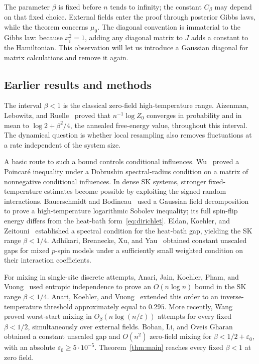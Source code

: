 The parameter $\beta$ is fixed before $n$ tends to infinity; the constant
$C_\beta$ may depend on that fixed choice. External fields enter the proof
through posterior Gibbs laws, while the theorem concerns $\mu_0$.
The diagonal convention is immaterial to the Gibbs law: because $x_i^2=1$,
adding any diagonal matrix to $J$ adds a constant to the Hamiltonian.
This observation will let us introduce a Gaussian diagonal for matrix
calculations and remove it again.

\subsection{Earlier results and methods}
The interval $\beta<1$ is the classical zero-field high-temperature
range. Aizenman, Lebowitz, and Ruelle~\cite[Proposition~2.1]{ALR1987}
proved that $n^{-1}\log Z_0$ converges in probability and in mean to
$\log2+\beta^2/4$, the annealed free-energy value, throughout this interval.
The dynamical question is whether local resampling also removes fluctuations at a rate independent
of the system size.

A basic route to such a bound controls conditional influences.
Wu~\cite{Wu2006} proved a Poincar\'e inequality under a
Dobrushin spectral-radius condition on a matrix of nonnegative
conditional influences.
In dense SK systems, stronger fixed-temperature estimates become possible
by exploiting the signed random interactions. Bauerschmidt and
Bodineau~\cite{BB2019} used a Gaussian field decomposition to prove a
high-temperature logarithmic Sobolev inequality; its full spin-flip energy
differs from the heat-bath form~\eqref{eq:dirichlet}.
Eldan, Koehler, and Zeitouni~\cite{EKZ2022} established a spectral
condition for the heat-bath gap, yielding the SK range $\beta<1/4$.
Adhikari, Brennecke, Xu, and Yau~\cite{ABXY2024} obtained constant
unscaled gaps for mixed $p$-spin models under a sufficiently small
weighted condition on their interaction coefficients.

For mixing in single-site discrete attempts, Anari, Jain, Koehler, Pham,
and Vuong~\cite{AJKPV2022} used entropic independence to prove an
$O(n\log n)$ bound in the SK range $\beta<1/4$.
Anari, Koehler, and Vuong~\cite{AKV2024} extended this order to an
inverse-temperature threshold approximately equal to $0.295$.
More recently, Wang~\cite[Theorem~1.1]{Wang2026} proved worst-start
mixing in $O_\beta(n\log(n/\varepsilon))$ attempts for every fixed
$\beta<1/2$, simultaneously over external fields. Boban, Li, and Oveis
Gharan~\cite[Theorem~1.5 and Corollary~1.6]{BLO2026} obtained a
constant unscaled gap and $O(n^2)$ zero-field mixing for
$\beta<1/2+\varepsilon_0$, with an absolute
$\varepsilon_0\ge5\cdot10^{-5}$. Theorem~\ref{thm:main} reaches
every fixed $\beta<1$ at zero field.

